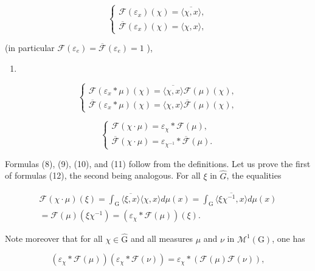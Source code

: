 \[
\left\{ \begin{array}{l} \mathcal {F} (\varepsilon_ {x}) (\chi) = \overline {{\langle \chi , x \rangle}}, \\ \overline {{\mathcal {F}}} (\varepsilon_ {x}) (\chi) = \langle \chi , x \rangle , \end{array} \right.
\]

(in particular \(\mathcal{F}(\varepsilon_e) = \overline{\mathcal{F}} (\varepsilon_e) = 1\) ),

\begin{enumerate}
\def\labelenumi{(\arabic{enumi})}
\setcounter{enumi}{10}
\tightlist
\item
\end{enumerate}

\[
\left\{ \begin{array}{l} \mathcal {F} (\varepsilon_ {x} * \mu) (\chi) = \overline {{\langle \chi , x \rangle}} \mathcal {F} (\mu) (\chi), \\ \overline {{\mathcal {F}}} (\varepsilon_ {x} * \mu) (\chi) = \langle \chi , x \rangle \overline {{\mathcal {F}}} (\mu) (\chi), \end{array} \right.\tag{12}
\]

\[
\left\{ \begin{array}{l} \mathcal {F} (\chi \cdot \mu) = \varepsilon_ {\chi} * \mathcal {F} (\mu), \\ \overline {{\mathcal {F}}} (\chi \cdot \mu) = \varepsilon_ {\chi^ {- 1}} * \overline {{\mathcal {F}}} (\mu). \end{array} \right.
\]

Formulas (8), (9), (10), and (11) follow from the definitions. Let us prove the first of formulas (12), the second being analogous. For all \(\xi\) in \(\widehat{G}\), the equalities

\[
\begin{array}{c} \mathcal {F} (\chi \cdot \mu) (\xi) = \int_ {\mathrm{G}} \overline {{\langle \xi , x \rangle}} \langle \chi , x \rangle d \mu (x) = \int_ {\mathrm{G}} \overline {{\langle \xi \chi^ {- 1} , x \rangle}} d \mu (x) \\ = \mathcal {F} (\mu) (\xi \chi^ {- 1}) = (\varepsilon_ {\chi} * \mathcal {F} (\mu)) (\xi). \end{array}
\]

Note moreover that for all \(\chi\in\widehat{\mathrm{G}}\) and all measures \(\mu\) and \(\nu\) in \(\mathcal{M}^{1}(\mathrm{G})\), one has

\[
(\varepsilon_ {\chi} * \mathcal {F} (\mu)) (\varepsilon_ {\chi} * \mathcal {F} (\nu)) = \varepsilon_ {\chi} * (\mathcal {F} (\mu) \mathcal {F} (\nu)),\tag{13}
\]

